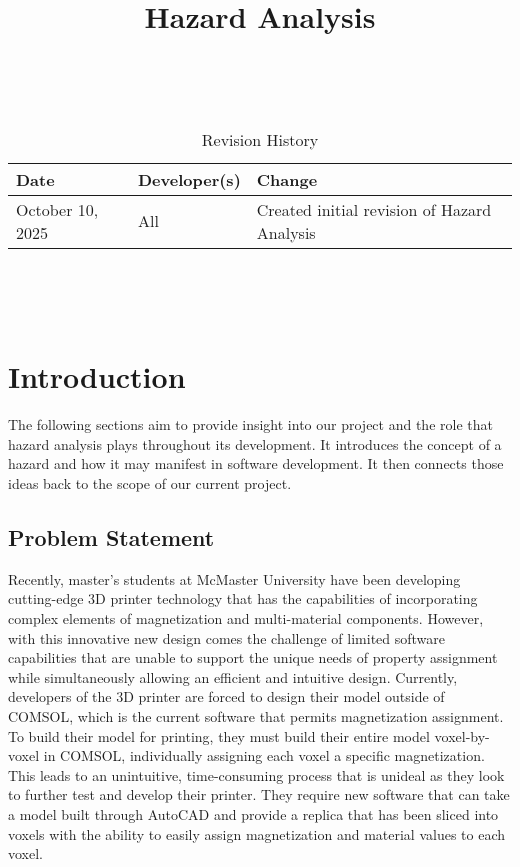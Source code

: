 \documentclass{article}
\title{Hazard Analysis\\\progname}
\author{\authname}
\date{}
\begin{document}
\maketitle
\thispagestyle{empty}

~\newpage


\begin{table}[hp]
\caption{Revision History} \label{TblRevisionHistory}
\begin{tabularx}{\textwidth}{llX}
\toprule
\textbf{Date} & \textbf{Developer(s)} & \textbf{Change}\\
\midrule
October 10, 2025 & All & Created initial revision of Hazard Analysis\\
\bottomrule
\end{tabularx}
\end{table}

~\newpage

\tableofcontents

~\newpage


\section{Introduction}

The following sections aim to provide insight into our project and the role that hazard analysis
plays throughout its development. It introduces the concept of a hazard and how it may manifest
in software development. It then connects those ideas back to the scope of our current project.

\subsection{Problem Statement}

Recently, master's students at McMaster University have been developing cutting-edge 3D
printer technology that has the capabilities of incorporating complex elements of
magnetization and multi-material components. However, with this innovative new design
comes the challenge of limited software capabilities that are unable to support the
unique needs of property assignment while simultaneously allowing an efficient and
intuitive design. Currently, developers of the 3D printer are forced to design their
model outside of COMSOL, which is the current software that permits magnetization assignment.
To build their model for printing, they must build their entire model voxel-by-voxel in
COMSOL, individually assigning each voxel a specific magnetization. This leads to an
unintuitive, time-consuming process that is unideal as they look to further test and develop
their printer. They require new software that can take a model built through AutoCAD and
provide a replica that has been sliced into voxels with the ability to easily assign
magnetization and material values to each voxel.
\end{document}
